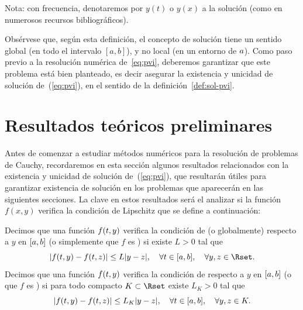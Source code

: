 Nota: con frecuencia, denotaremos por $y(t)$ o $y(x)$ a la solución (como
  en numerosos recursos bibliográficos).

Obsérvese que, según esta definición, el concepto de solución tiene un
sentido global (en todo el intervalo $[a,b]$), y no local (en un entorno
de $\ta$). Como paso previo a la resolución numérica
de~\eqref{eq:pvi}, deberemos garantizar que este problema está bien
planteado, es decir asegurar la existencia y unicidad de solución
de~(\ref{eq:pvi}), en el sentido de la definición~\ref{def:sol-pvi}.

\section{Resultados teóricos preliminares}
\label{sec:tema4:resultados-teoricos}

Antes de comenzar a estudiar métodos numéricos para la resolución de
problemas de Cauchy, recordaremos en esta sección algunos
resultados relacionados con la existencia y unicidad de solución
de~(\ref{eq:pvi}), que resultarán útiles para garantizar existencia de
solución en los problemas que aparecerán en las siguientes secciones.
La clave en estos resultados será el analizar si la función $f(x,y)$
verifica la condición de Lipschitz que se define a continuación:

\begin{definition}
  \label{def:lipschitz}
  Decimos que una función $f(\tt,y)$ verifica la condición de
   (o globalmente) respecto a $y$ en
    $[\ta,\tb]$ (o simplemente que $f$ es \globLipschitz)
    si existe $L>0$ tal que
  \begin{equation*}
    |f(\tt,y) - f(\tt,z)| \le L |y-z|, \quad \forall \tt\in [\ta,\tb],
    \quad  \forall y,z\in \Rset.
  \end{equation*}
  Decimos que una función $f(\tt,y)$ verifica la condición de
   respecto a $y$ en
  $[\ta,\tb]$ (o que $f$ es \locLipschitz) si para todo compacto
  $K\subset\Rset$ existe $L_K>0$ tal que
  \begin{equation*}
    |f(\tt,y) - f(\tt,z)| \le L_K |y-z|, \quad \forall \tt\in [\ta,\tb],
    \quad  \forall y,z\in K.
  \end{equation*}
\end{definition}

